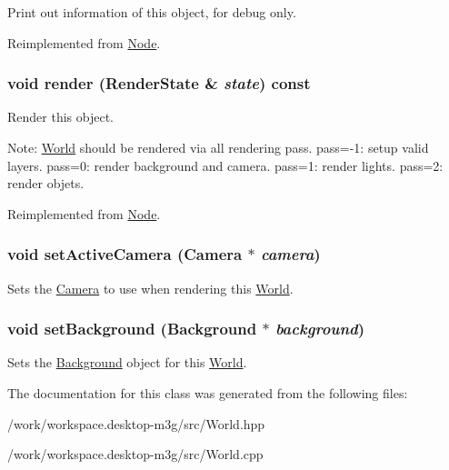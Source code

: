 Print out information of this object, for debug only. 

Reimplemented from \hyperlink{classm3g_1_1Node_6fea17fa1532df3794f8cb39cb4f911f}{Node}.\hypertarget{classm3g_1_1World_8babc8a79b78615da51161e94029eea9}{
\subsubsection[{render}]{\setlength{\rightskip}{0pt plus 5cm}void render ({\bf RenderState} \& {\em state}) const}}
\label{classm3g_1_1World_8babc8a79b78615da51161e94029eea9}


Render this object.

Note: \hyperlink{classm3g_1_1World}{World} should be rendered via all rendering pass. pass=-1: setup valid layers. pass=0: render background and camera. pass=1: render lights. pass=2: render objets. 

Reimplemented from \hyperlink{classm3g_1_1Node_8babc8a79b78615da51161e94029eea9}{Node}.\hypertarget{classm3g_1_1World_dd9a82b335e8521592ad410c662a5cfd}{
\subsubsection[{setActiveCamera}]{\setlength{\rightskip}{0pt plus 5cm}void setActiveCamera ({\bf Camera} $\ast$ {\em camera})}}
\label{classm3g_1_1World_dd9a82b335e8521592ad410c662a5cfd}


Sets the \hyperlink{classm3g_1_1Camera}{Camera} to use when rendering this \hyperlink{classm3g_1_1World}{World}. \hypertarget{classm3g_1_1World_6193765c76d6dc0450f264918ebe7e1c}{
\subsubsection[{setBackground}]{\setlength{\rightskip}{0pt plus 5cm}void setBackground ({\bf Background} $\ast$ {\em background})}}
\label{classm3g_1_1World_6193765c76d6dc0450f264918ebe7e1c}


Sets the \hyperlink{classm3g_1_1Background}{Background} object for this \hyperlink{classm3g_1_1World}{World}. 

The documentation for this class was generated from the following files:\begin{CompactItemize}
\item 
/work/workspace.desktop-m3g/src/World.hpp\item 
/work/workspace.desktop-m3g/src/World.cpp\end{CompactItemize}
